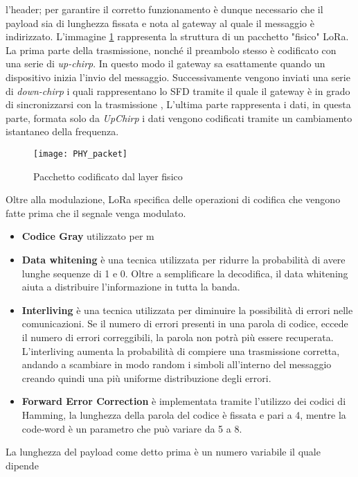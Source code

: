 l'header; per garantire il corretto funzionamento è dunque necessario che il
payload sia di lunghezza fissata e nota al gateway al quale il messaggio è
indirizzato.
L'immagine  \ref{fig:freq_lora_chirp} rappresenta la struttura di un  
pacchetto "fisico" LoRa.
La prima parte della trasmissione, nonché il preambolo  stesso è codificato con una
serie di \emph{up-chirp}. In questo modo il gateway sa esattamente quando un
dispositivo inizia l'invio del messaggio. Successivamente vengono inviati una serie di
\emph{down-chirp} i quali rappresentano lo SFD tramite il quale il gateway è in
grado di sincronizzarsi con la trasmissione ,
L'ultima parte rappresenta i dati, in questa parte, formata solo da
\emph{UpChirp} i dati vengono codificati tramite un cambiamento istantaneo della
frequenza.
\begin{figure}[h]
        \centering 
                \texttt{[image: PHY\_packet]}
        \caption{Pacchetto codificato dal layer fisico}
        \label{fig:freq_lora_chirp}
\end{figure}
Oltre alla modulazione, LoRa specifica delle operazioni di codifica che vengono
fatte prima che il segnale venga modulato.
\begin{itemize}
        \item \textbf{Codice Gray} utilizzato per m 
        \item \textbf{Data whitening} è una tecnica utilizzata per ridurre la
        probabilità di avere lunghe sequenze di 1 e 0. Oltre a semplificare la
        decodifica, il data whitening aiuta a distribuire l'informazione in tutta la
        banda.
        \item \textbf{Interliving} è una tecnica utilizzata per diminuire la
        possibilità di errori nelle comunicazioni. Se il numero di errori
        presenti in una parola di codice, eccede il numero di errori
        correggibili, la parola non potrà più essere recuperata. L'interliving
        aumenta la probabilità di compiere una trasmissione corretta, andando a
        scambiare in modo random i simboli all'interno del messaggio creando
        quindi una più uniforme distribuzione degli errori.
        \item \textbf{Forward Error Correction} è implementata tramite
        l'utilizzo dei codici di Hamming, la lunghezza della parola del codice è
        fissata e pari a 4, mentre la code-word è un parametro che può variare
        da 5 a 8.
\end{itemize}
La lunghezza del payload come detto prima è un numero variabile il quale dipende
